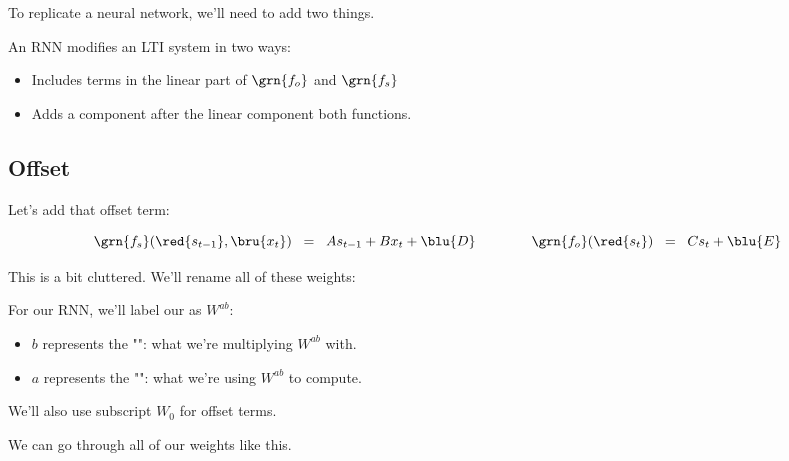         To replicate a neural network, we'll need to add two things.\\

        \begin{concept}
            An RNN modifies an LTI system in two ways:
    
            \begin{itemize}
                \item Includes  terms in the linear part of $\grn{f_o}$ and $\grn{f_s}$
                \item Adds a  component after the linear component both functions.
            \end{itemize}
        \end{concept}

    \subsection{Offset}

        Let's add that offset term:

        \begin{equation*}
            \grn{f_s}(\red{s_{t-1}},\bru{x_t}) 
            \;\;=\;\; As_{t-1} + Bx_t + \blu{D}
            \qquad \qquad
            \grn{f_o}(\red{s_t}) 
            \;\;=\;\; Cs_t + \blu{E}
        \end{equation*}

        This is a bit cluttered. We'll rename all of these weights:\\

        \begin{notation}
            For our RNN, we'll label our  as $W^{ab}$:

            \begin{itemize}
                \item $b$ represents the "": what we're multiplying $W^{ab}$ with.
                \item $a$ represents the "": what we're using $W^{ab}$ to compute.
            \end{itemize}

            We'll also use subscript $W_0$ for offset terms.
            
        \end{notation}

        We can go through all of our weights like this.\\

